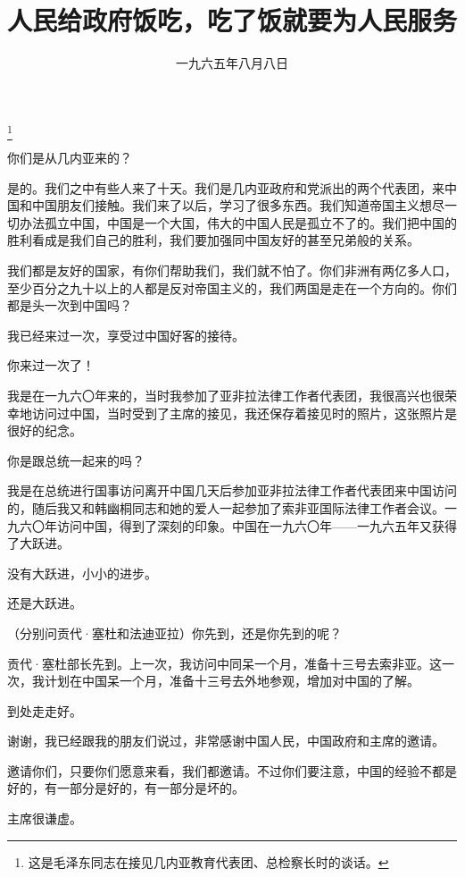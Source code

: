 
\title{人民给政府饭吃，吃了饭就要为人民服务}
\date{一九六五年八月八日}
\thanks{这是毛泽东同志在接见几内亚教育代表团、总检察长时的谈话。}
\maketitle


你们是从几内亚来的？

是的。我们之中有些人来了十天。我们是几内亚政府和党派出的两个代表团，来中国和中国朋友们接触。我们来了以后，学习了很多东西。我们知道帝国主义想尽一切办法孤立中国，中国是一个大国，伟大的中国人民是孤立不了的。我们把中国的胜利看成是我们自己的胜利，我们要加强同中国友好的甚至兄弟般的关系。

我们都是友好的国家，有你们帮助我们，我们就不怕了。你们非洲有两亿多人口，至少百分之九十以上的人都是反对帝国主义的，我们两国是走在一个方向的。你们都是头一次到中国吗？

我已经来过一次，享受过中国好客的接待。

你来过一次了！

我是在一九六〇年来的，当时我参加了亚非拉法律工作者代表团，我很高兴也很荣幸地访问过中国，当时受到了主席的接见，我还保存着接见时的照片，这张照片是很好的纪念。

你是跟总统一起来的吗？

我是在总统进行国事访问离开中国几天后参加亚非拉法律工作者代表团来中国访问的，随后我又和韩幽桐同志和她的爱人一起参加了索非亚国际法律工作者会议。一九六〇年访问中国，得到了深刻的印象。中国在一九六〇年——一九六五年又获得了大跃进。

没有大跃进，小小的进步。

还是大跃进。

（分别问贡代·塞杜和法迪亚拉）你先到，还是你先到的呢？

贡代·塞杜部长先到。上一次，我访问中同呆一个月，准备十三号去索非亚。这一次，我计划在中国呆一个月，准备十三号去外地参观，增加对中国的了解。

到处走走好。

谢谢，我已经跟我的朋友们说过，非常感谢中国人民，中国政府和主席的邀请。

邀请你们，只要你们愿意来看，我们都邀请。不过你们要注意，中国的经验不都是好的，有一部分是好的，有一部分是坏的。

主席很谦虚。

